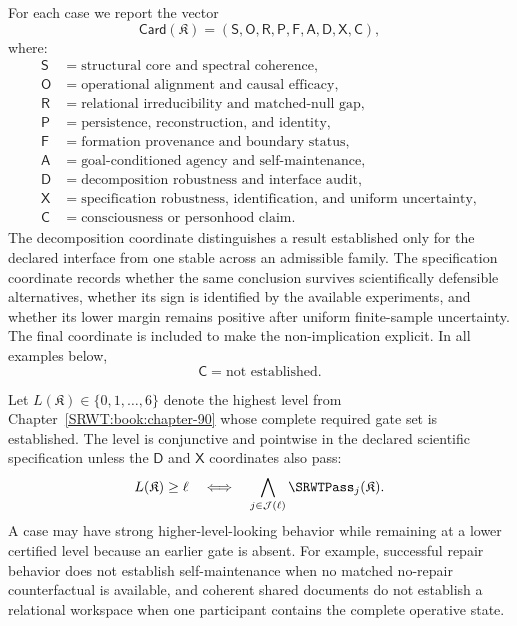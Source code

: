 
For each case we report the vector
\[
\boxed{
\mathsf{Card}(\mathfrak K)
=
\left(
\mathsf S,
\mathsf O,
\mathsf R,
\mathsf P,
\mathsf F,
\mathsf A,
\mathsf D,
\mathsf X,
\mathsf C
\right),
}
\]
where:
\[
\begin{array}{ll}
\mathsf S & = \text{structural core and spectral coherence},\\
\mathsf O & = \text{operational alignment and causal efficacy},\\
\mathsf R & = \text{relational irreducibility and matched-null gap},\\
\mathsf P & = \text{persistence, reconstruction, and identity},\\
\mathsf F & = \text{formation provenance and boundary status},\\
\mathsf A & = \text{goal-conditioned agency and self-maintenance},\\
\mathsf D & = \text{decomposition robustness and interface audit},\\
\mathsf X & = \text{specification robustness, identification, and uniform uncertainty},\\
\mathsf C & = \text{consciousness or personhood claim}.
\end{array}
\]
The decomposition coordinate distinguishes a result established only for the
declared interface from one stable across an admissible family. The
specification coordinate records whether the same conclusion survives
scientifically defensible alternatives, whether its sign is identified by the
available experiments, and whether its lower margin remains positive after
uniform finite-sample uncertainty. The final coordinate is included to make
the non-implication explicit. In all examples below,
\[
\mathsf C=\text{not established}.
\]


Let \(L(\mathfrak K)\in\{0,1,\ldots,6\}\) denote the highest level from
Chapter~\ref{SRWT:book:chapter-90} whose complete required gate set is established. The level is
conjunctive and pointwise in the declared scientific specification unless the
\(\mathsf D\) and \(\mathsf X\) coordinates also pass:
\[
L(\mathfrak K)\geq \ell
\quad\Longleftrightarrow\quad
\bigwedge_{j\in\mathcal J(\ell)}\SRWTPass_j(\mathfrak K).
\]
A case may have strong higher-level-looking behavior while remaining at a lower
certified level because an earlier gate is absent. For example, successful
repair behavior does not establish self-maintenance when no matched no-repair
counterfactual is available, and coherent shared documents do not establish a
relational workspace when one participant contains the complete operative
state.

